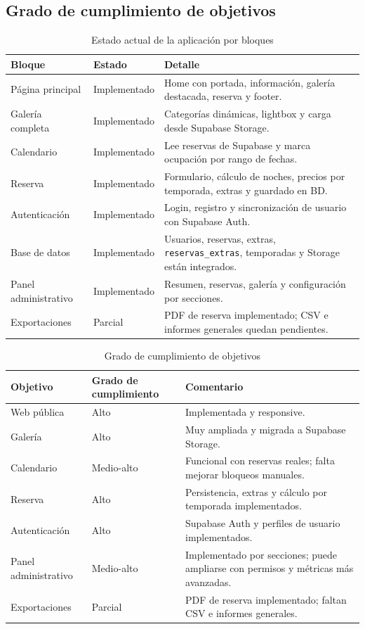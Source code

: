 \documentclass[11pt,a4paper]{article}
\begin{document}
\subsection{Grado de cumplimiento de objetivos}
\begin{table}[H]
\centering
\small
\begin{tabularx}{\textwidth}{|p{3.2cm}|p{2.8cm}|X|}
\hline
\textbf{Bloque} & \textbf{Estado} & \textbf{Detalle} \\
\hline
Página principal & Implementado & Home con portada, información, galería destacada, reserva y footer. \\
\hline
Galería completa & Implementado & Categorías dinámicas, lightbox y carga desde Supabase Storage. \\
\hline
Calendario & Implementado & Lee reservas de Supabase y marca ocupación por rango de fechas. \\
\hline
Reserva & Implementado & Formulario, cálculo de noches, precios por temporada, extras y guardado en BD. \\
\hline
Autenticación & Implementado & Login, registro y sincronización de usuario con Supabase Auth. \\
\hline
Base de datos & Implementado & Usuarios, reservas, extras, \texttt{reservas\_extras}, temporadas y Storage están integrados. \\
\hline
Panel administrativo & Implementado & Resumen, reservas, galería y configuración por secciones. \\
\hline
Exportaciones & Parcial & PDF de reserva implementado; CSV e informes generales quedan pendientes. \\
\hline
\end{tabularx}
\caption{Estado actual de la aplicación por bloques}
\end{table}

\begin{table}[H]
\centering
\small
\begin{tabularx}{\textwidth}{|p{3.2cm}|p{2.8cm}|X|}
\hline
\textbf{Objetivo} & \textbf{Grado de cumplimiento} & \textbf{Comentario} \\
\hline
Web pública & Alto & Implementada y responsive. \\
\hline
Galería & Alto & Muy ampliada y migrada a Supabase Storage. \\
\hline
Calendario & Medio-alto & Funcional con reservas reales; falta mejorar bloqueos manuales. \\
\hline
Reserva & Alto & Persistencia, extras y cálculo por temporada implementados. \\
\hline
Autenticación & Alto & Supabase Auth y perfiles de usuario implementados. \\
\hline
Panel administrativo & Medio-alto & Implementado por secciones; puede ampliarse con permisos y métricas más avanzadas. \\
\hline
Exportaciones & Parcial & PDF de reserva implementado; faltan CSV e informes generales. \\
\hline
\end{tabularx}
\caption{Grado de cumplimiento de objetivos}
\end{table}
\end{document}
